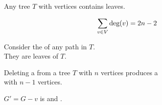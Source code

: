 \begin{frame}{}
  \begin{lemma}
    Any tree $T$ with  vertices contains  leaves.
  \end{lemma}

  \pause
  \vspace{0.30cm}
  \[
    \sum_{v \in V} \text{deg}(v) = 2n - 2
  \]

  \pause
  \vspace{0.50cm}
  \begin{center}
    Consider the  of any  path in $T$.
    \pause \\[5pt]
    They are leaves of $T$.
  \end{center}
\end{frame}

\begin{frame}{}
  \begin{lemma}
    Deleting a  from a tree $T$ with $n$ vertices
    produces a  \\ with $n-1$ vertices.
  \end{lemma}

  \pause
  \vspace{0.30cm}
  \begin{center}

    \vspace{0.20cm}
    $G' = G - v$ is  and .

    \pause
    \vspace{0.50cm}

    \pause
    \vspace{0.80cm}
  \end{center}
\end{frame}


